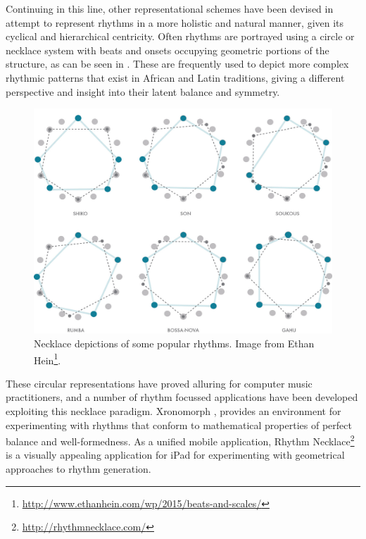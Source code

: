Continuing in this line, other representational schemes have been devised in attempt to represent rhythms in a more holistic and natural manner, given its cyclical and hierarchical centricity. Often rhythms are portrayed using a circle or necklace system with beats and onsets occupying geometric portions of the structure, as can be seen in . These are frequently used to depict more complex rhythmic patterns that exist in African and Latin traditions, giving a different perspective and insight into their latent balance and symmetry.

\begin{figure}
	\begin{center}
		\includegraphics[width=\figSizeHundred]{ch03_symbolic/figures/necklace.jpg}
	\end{center}
	\caption[Necklace depictions of some popular rhythms.]{Necklace depictions of some popular rhythms. Image from Ethan Hein\footnote{\url{http://www.ethanhein.com/wp/2015/beats-and-scales/}}.}
	\label{fig:necklace}
\end{figure}

These circular representations have proved alluring for computer music practitioners, and a number of rhythm focussed applications have been developed exploiting this necklace paradigm. Xronomorph \citep{Milne2015a, Milne2016}, provides an environment for experimenting with rhythms that conform to mathematical properties of perfect balance and well-formedness. As a unified mobile application, Rhythm Necklace\footnote{\url{http://rhythmnecklace.com/}} is a visually appealing application for iPad for experimenting with geometrical approaches to rhythm generation.

